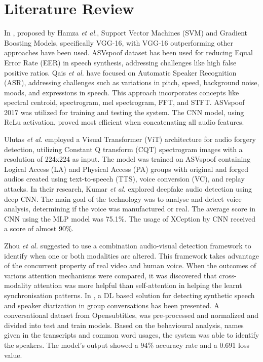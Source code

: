 \documentclass[conference]{IEEEtran}
\begin{document}
\section{Literature Review}



In \cite{b1}, proposed by Hamza \textit{et al.}, Support Vector Machines (SVM) and Gradient Boosting Models, specifically VGG-16, with VGG-16 outperforming other approaches have been used. ASVspoof dataset has been used for reducing Equal Error Rate (EER) in speech synthesis, addressing challenges like high false positive ratios. 
Qais \textit{et al.} \cite{b2} have focused on Automatic Speaker Recognition (ASR), addressing challenges such as variations in pitch, speed, background noise, moods, and expressions in speech. This approach incorporates concepts like spectral centroid, spectrogram, mel spectrogram, FFT, and STFT. ASVspoof 2017 was utilized for training and testing the system. The CNN model, using ReLu activation, proved most efficient when concatenating all audio features.

Ulutas \textit{et al.} \cite{b3} employed a Visual Transformer (ViT) architecture for audio forgery detection, utilizing Constant Q transform (CQT) spectrogram images with a resolution of 224x224 as input. The model was trained on ASVspoof  containing Logical Access (LA) and Physical Access (PA) groups with original and forged audios created using text-to-speech (TTS), voice conversion (VC), and replay attacks.  
In their research, Kumar \textit{et al.} \cite{b4} explored deepfake audio detection using deep CNN. The main goal of the technology was to analyse and detect voice analysis, determining if the voice was manufactured or real. The average score in CNN using the MLP model was 75.1\%. The usage of XCeption by CNN received a score of almost 90\%. 

Zhou \textit{et al.} \cite{b5} suggested to use a combination audio-visual detection framework to identify when one or both modalities are altered. This framework takes advantage of the concurrent property of real video and human voice. When the outcomes of various attention mechanisms were compared, it was discovered that cross-modality attention was more helpful than self-attention in helping the learnt synchronisation patterns.
In \cite{b6}, a DL based solution for detecting synthetic speech and speaker diarization in group conversations has been presented. A conversational dataset from Opensubtitles, was pre-processed and normalized and divided into test and train models. Based on the behavioural analysis, names given in the transcripts and common word usages, the system was able to identify the speakers. The model's output showed a 94\% accuracy rate and a 0.691 loss value.
\end{document}
